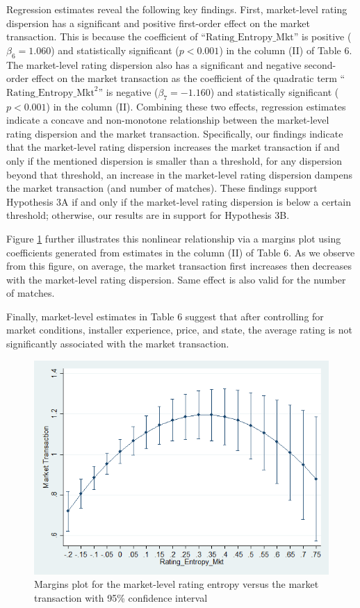 \documentclass[msom,blindrev]{informs3}
\begin{document}
	
	
	
	
	Regression estimates reveal the following key findings. First, market-level rating dispersion has a significant and positive first-order effect on the market transaction. This is because the coefficient of ``$\text{Rating\_Entropy\_Mkt}$'' is positive ($\beta_{6}=1.060$) and statistically significant ($p<0.001$) in the column (II) of Table 6. The market-level rating dispersion also has a significant and negative second-order effect on the market transaction as the coefficient of the quadratic term ``$\text{Rating\_Entropy\_Mkt}^2$'' is negative ($\beta_{7}=-1.160$) and statistically significant ($p<0.001$) in the column (II). Combining these two effects, regression estimates indicate a concave and non-monotone relationship between the market-level rating dispersion and the market transaction.  Specifically, our findings indicate that the market-level rating dispersion increases the market transaction if and only if the mentioned dispersion is smaller than a threshold, for any dispersion beyond that threshold, an increase in the market-level rating dispersion dampens the market transaction (and number of matches). These findings support Hypothesis 3A if and only if the market-level rating dispersion is below a certain threshold; otherwise, our results are in support for Hypothesis 3B.
	
	Figure \ref{fig: marginsplot_mkt_entmkt} further illustrates this nonlinear relationship via a margins plot using coefficients generated from estimates in the column (II) of Table 6. As we observe from this figure, on average, the market transaction first increases then decreases with the market-level rating dispersion. Same effect is also valid for the number of matches.
	
	Finally, market-level estimates in Table 6 suggest that after controlling for market conditions, installer experience, price, and state, the average rating is not significantly associated with the market transaction.
	\begin{figure}
		\centering
		\includegraphics[width=0.7\linewidth]{marginsplot_entmkt.png}
		\caption{Margins plot for the market-level rating entropy versus the market transaction with 95\% confidence interval}
		\label{fig: marginsplot_mkt_entmkt}
	\end{figure}
	
\end{document}

